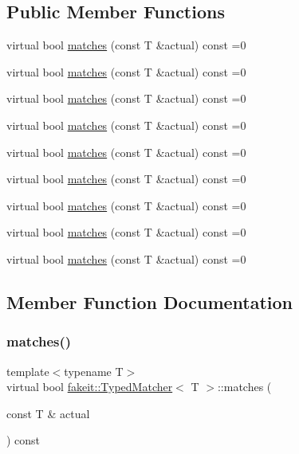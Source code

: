 \subsection*{Public Member Functions}
\begin{DoxyCompactItemize}
\item 
virtual bool \mbox{\hyperlink{structfakeit_1_1TypedMatcher_ac553bb6ac7c98a489c92fa6ace0f2e2b}{matches}} (const T \&actual) const =0
\item 
virtual bool \mbox{\hyperlink{structfakeit_1_1TypedMatcher_ac553bb6ac7c98a489c92fa6ace0f2e2b}{matches}} (const T \&actual) const =0
\item 
virtual bool \mbox{\hyperlink{structfakeit_1_1TypedMatcher_ac553bb6ac7c98a489c92fa6ace0f2e2b}{matches}} (const T \&actual) const =0
\item 
virtual bool \mbox{\hyperlink{structfakeit_1_1TypedMatcher_ac553bb6ac7c98a489c92fa6ace0f2e2b}{matches}} (const T \&actual) const =0
\item 
virtual bool \mbox{\hyperlink{structfakeit_1_1TypedMatcher_ac553bb6ac7c98a489c92fa6ace0f2e2b}{matches}} (const T \&actual) const =0
\item 
virtual bool \mbox{\hyperlink{structfakeit_1_1TypedMatcher_ac553bb6ac7c98a489c92fa6ace0f2e2b}{matches}} (const T \&actual) const =0
\item 
virtual bool \mbox{\hyperlink{structfakeit_1_1TypedMatcher_ac553bb6ac7c98a489c92fa6ace0f2e2b}{matches}} (const T \&actual) const =0
\item 
virtual bool \mbox{\hyperlink{structfakeit_1_1TypedMatcher_ac553bb6ac7c98a489c92fa6ace0f2e2b}{matches}} (const T \&actual) const =0
\item 
virtual bool \mbox{\hyperlink{structfakeit_1_1TypedMatcher_ac553bb6ac7c98a489c92fa6ace0f2e2b}{matches}} (const T \&actual) const =0
\end{DoxyCompactItemize}


\subsection{Member Function Documentation}
\mbox{\label{structfakeit_1_1TypedMatcher_ac553bb6ac7c98a489c92fa6ace0f2e2b}} 
\subsubsection{\texorpdfstring{matches()}{matches()}\hspace{0.1cm}{\footnotesize\ttfamily [1/9]}}
{\footnotesize\ttfamily template$<$typename T$>$ \\
virtual bool \mbox{\hyperlink{structfakeit_1_1TypedMatcher}{fakeit\+::\+Typed\+Matcher}}$<$ T $>$\+::matches (\begin{DoxyParamCaption}\item[{const T \&}]{actual }\end{DoxyParamCaption}) const\hspace{0.3cm}{\ttfamily [pure virtual]}}



